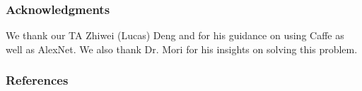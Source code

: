 \documentclass{article} %
\begin{document}
\subsubsection*{Acknowledgments}
We thank our TA Zhiwei (Lucas) Deng and for his guidance on using Caffe as well as AlexNet. We also thank Dr. Mori for his insights on solving this problem. 
 
\renewcommand\refname{\vskip -.75cm}
\subsubsection*{References}

   		    
   
\end{document}
